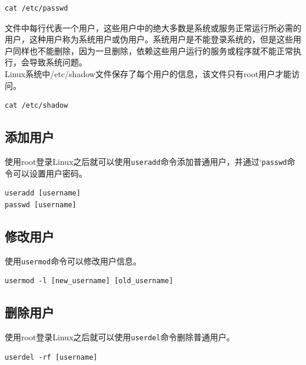 \documentclass[12pt, openany, oneside]{book}
\begin{document}
\vspace{-0.5cm}
\begin{lstlisting}
cat /etc/passwd
\end{lstlisting}

文件中每行代表一个用户，这些用户中的绝大多数是系统或服务正常运行所必需的用户，这种用户称为系统用户或伪用户。系统用户是不能登录系统的，但是这些用户同样也不能删除，因为一旦删除，依赖这些用户运行的服务或程序就不能正常执行，会导致系统问题。 \\

Linux系统中/etc/shadow文件保存了每个用户的信息，该文件只有root用户才能访问。

\vspace{-0.5cm}
\begin{lstlisting}
cat /etc/shadow
\end{lstlisting}

\subsection{添加用户}

使用root登录Linux之后就可以使用\lstinline|useradd|命令添加普通用户，并通过`\lstinline|passwd|命令可以设置用户密码。

\vspace{-0.5cm}
\begin{lstlisting}
useradd [username]
passwd [username]
\end{lstlisting}

\subsection{修改用户}

使用\lstinline|usermod|命令可以修改用户信息。

\vspace{-0.5cm}
\begin{lstlisting}
usermod -l [new_username] [old_username]
\end{lstlisting}

\subsection{删除用户}

使用root登录Linux之后就可以使用\lstinline|userdel|命令删除普通用户。

\vspace{-0.5cm}
\begin{lstlisting}
userdel -rf [username]
\end{lstlisting}
\end{document}
